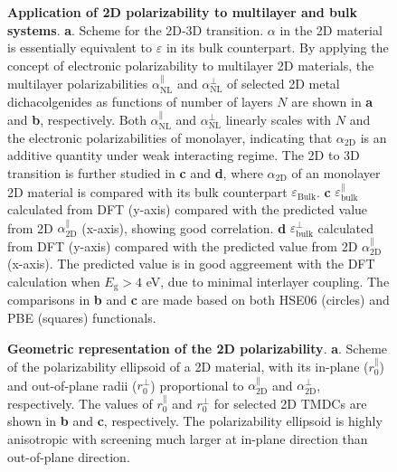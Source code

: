 \begin{figure}[H]
\centering
\caption{\label{fig-4} \textbf{Application of 2D polarizability to
    multilayer and bulk systems}.  \textbf{a}. Scheme for the 2D-3D
  transition. $\alpha$ in the 2D material is essentially equivalent to
  $\varepsilon$ in its bulk counterpart.  By applying the concept of
  electronic polarizability to multilayer 2D materials, the multilayer
  polarizabilities $\alpha_{\mathrm{NL}}^{\parallel}$ and
  $\alpha_{\mathrm{NL}}^{\perp}$ of selected 2D metal dichacolgenides
  as functions of number of layers $N$ are shown in \textbf{a} and
  \textbf{b}, respectively. Both $\alpha_{\mathrm{NL}}^{\parallel}$
  and $\alpha_{\mathrm{NL}}^{\perp}$ linearly scales with $N$ and the
  electronic polarizabilities of monolayer, indicating that
  $\alpha_{\mathrm{2D}}$ is an additive quantity under weak
  interacting regime. The 2D to 3D transition is further studied in
  \textbf{c} and \textbf{d}, where $\alpha_{\mathrm{2D}}$ of an
  monolayer 2D material is compared with its bulk counterpart
  $\varepsilon_{\mathrm{Bulk}}$. \textbf{c}
  $\varepsilon_{\mathrm{bulk}}^{\parallel}$ calculated from DFT
  (y-axis) compared with the predicted value from 2D
  $\alpha_{\mathrm{2D}}^{\parallel}$ (x-axis), showing good
  correlation. \textbf{d} $\varepsilon_{\mathrm{bulk}}^{\perp}$
  calculated from DFT (y-axis) compared with the predicted value from
  2D $\alpha_{\mathrm{2D}}^{\parallel}$ (x-axis). The predicted value
  is in good aggreement with the DFT calculation when
  $E_{\mathrm{g}}>4$ eV, due to minimal interlayer coupling. The
  comparisons in \textbf{b} and \textbf{c} are made based on both
  HSE06 (circles) and PBE (squares) functionals.}
\end{figure}

\begin{figure}[H]
  \centering
  \caption{\label{fig-ellip} \textbf{Geometric representation of the
      2D polarizability}. \textbf{a}. Scheme of the polarizability
    ellipsoid of a 2D material, with its in-plane
    ($r_{0}^{\parallel}$) and out-of-plane radii
    ($r_{\mathrm{0}}^{\perp}$) proportional to
    $\alpha_{\mathrm{2D}}^{\parallel}$ and
    $\alpha_{\mathrm{2D}}^{\perp}$, respectively.  The values of
    $r_{0}^{\parallel}$ and $r_{0}^{\perp}$ for selected 2D TMDCs are
    shown in \textbf{b} and \textbf{c}, respectively.  The
    polarizability ellipsoid is highly anisotropic with screening much
    larger at in-plane direction than out-of-plane direction.}
\end{figure}



